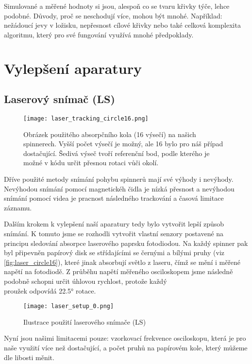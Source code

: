 Simulované a měřené hodnoty si jsou, alespoň co se tvaru křivky týče, lehce podobné. Důvody, proč se neschodují více, mohou být mnohé. Například: nežádoucí jevy v ložisku, nepřesnost cílové křivky nebo také celková komplexita algoritmu, který pro své fungování využívá mnohé předpoklady.


\clearpage

\section{Vylepšení aparatury}

\subsection{Laserový snímač (LS)}

\begin{wrapfigure}{r}{0.45\textwidth}
    \texttt{[image: laser\_tracking\_circle16.png]}
    \centering
    \caption[Obrázek použitého absorpčního kola]{Obrázek použitého absorpčního kola (16 výsečí) na našich spinnerech. Vyšší počet výsečí je možný, ale 16 bylo pro náš případ dostačující. Šedivá výseč tvoří referenční bod, podle kterého je možné v kódu určit přesnou rotaci vůči okolí. }
    \label{fig:laser_circle16}
\end{wrapfigure}

Dříve použité metody snímání pohybu spinnerů mají své výhody i nevýhody. Nevýhodou snímání pomocí magnetickéh čidla je nízká přesnost a nevýhodou snímání pomocí videa je pracnost následného trackování a časová limitace záznamu.

Dalším krokem k vylepšení naší aparatury tedy bylo vytvořit lepší způsob snímání. K tomuto jsme se rozhodli vytvořit vlastní senzory postavené na principu sledování absorpce laserového paprsku fotodiodou. Na každý spinner pak byl připevněn papírový disk  se střídajícími se černými a bílými pruhy (viz \autoref{fig:laser_circle16}), které jinak absorbují světlo z laseru, čímž se mění i měřené napětí na fotodiodě. Z průběhu napětí měřeného osciloskopem jsme následně podobně schopni určit úhlovou rychlost, protože každý \\ proužek odpovídá 22.5° rotace.

\begin{wrapfigure}{r}{0.45\textwidth}
    \texttt{[image: laser\_setup\_0.png]}
    \centering
    \caption{Ilustrace použití laserového snímače (LS)}
    \label{fig:LS_diode}
\end{wrapfigure}
Nyní jsou našimi limitacemi pouze: vzorkovací frekvence osciloskopu, která je pro naše využití více než dostačující, a počet pruhů na papírovém kole, který můžeme dle libosti měnit.


